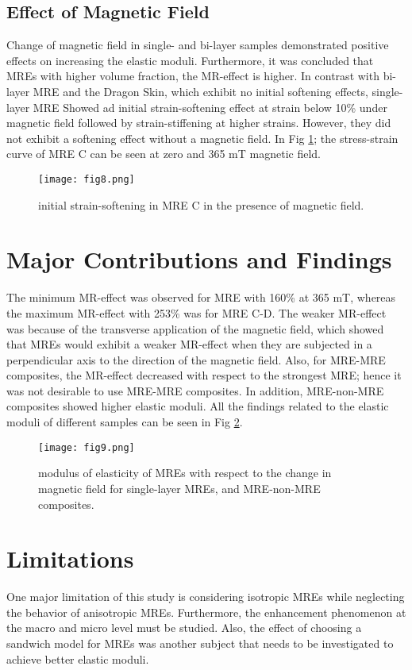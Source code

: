 \documentclass[conference]{IEEEtran}
\begin{document}
\subsection{Effect of Magnetic Field}
Change of magnetic field in single- and bi-layer samples demonstrated positive effects on increasing the elastic moduli. Furthermore, it was concluded that MREs with higher volume fraction, the MR-effect is higher. In contrast with bi-layer MRE and the Dragon Skin, which exhibit no initial softening effects, single-layer MRE Showed ad initial strain-softening effect at strain below 10\% under magnetic field followed by strain-stiffening at higher strains. However, they did not exhibit a softening effect without a magnetic field. In Fig \ref{fig8}; the stress-strain curve of MRE C can be seen at zero and 365 mT magnetic field.\\
\begin{figure}[t]
	\centerline{\texttt{[image: fig8.png]}}
	\caption{initial strain-softening in MRE C in the presence of magnetic field.}
	\label{fig8}
\end{figure}
\section{Major Contributions and Findings}
The minimum MR-effect was observed for MRE with 160\% at 365 mT, whereas the maximum MR-effect with 253\% was for MRE C-D. The weaker MR-effect was because of the transverse application of the magnetic field, which showed that MREs would exhibit a weaker MR-effect when they are subjected in a perpendicular axis to the direction of the magnetic field. Also, for MRE-MRE composites, the MR-effect decreased with respect to the strongest MRE; hence it was not desirable to use MRE-MRE composites. In addition, MRE-non-MRE composites showed higher elastic moduli. All the findings related to the elastic moduli of different samples can be seen in Fig \ref{fig9}. 
\begin{figure}[t]
	\centerline{\texttt{[image: fig9.png]}}
	\caption{modulus of elasticity of MREs with respect to the change in magnetic field for single-layer MREs, and MRE-non-MRE composites.}
	\label{fig9}
\end{figure}

\section{Limitations}
One major limitation of this study is considering isotropic MREs while neglecting the behavior of anisotropic MREs. Furthermore, the enhancement phenomenon at the macro and micro level must be studied. Also, the effect of choosing a sandwich model for MREs was another subject that needs to be investigated to achieve better elastic moduli. 
\end{document}
